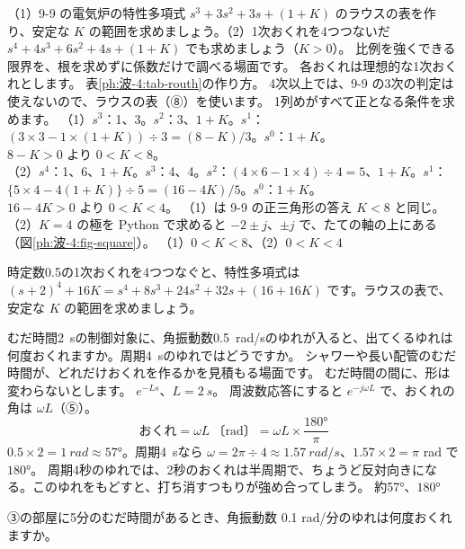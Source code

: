 \label{ph:波-4:ex8}
\begin{phreidai}
（1）9-9 の電気炉の特性多項式 $s^3+3s^2+3s+(1+K)$ のラウスの表を作り、安定な $K$ の範囲を求めましょう。（2）1次おくれを4つつないだ $s^4+4s^3+6s^2+4s+(1+K)$ でも求めましょう（$K>0$）。
\phbamen
比例を強くできる限界を、根を求めずに係数だけで調べる場面です。
\phmushi
各おくれは理想的な1次おくれとします。
\phzu
表\ref{ph:波-4:tab-routh}の作り方。
\phriyu
4次以上では、9-9 の3次の判定は使えないので、ラウスの表（⑧）を使います。
\phtateru
1列めがすべて正となる条件を求めます。
\phtoku
（1）$s^3$：1、3。$s^2$：3、$1+K$。$s^1$：$(3\times3-1\times(1+K))\div3=(8-K)/3$。$s^0$：$1+K$。\\
$8-K>0$ より $0<K<8$。\\
（2）$s^4$：1、6、$1+K$。$s^3$：4、4。$s^2$：$(4\times6-1\times4)\div4=5$、$1+K$。$s^1$：$\{5\times4-4(1+K)\}\div5=(16-4K)/5$。$s^0$：$1+K$。\\
$16-4K>0$ より $0<K<4$。
\phtashikame
（1）は 9-9 の正三角形の答え $K<8$ と同じ。\\
（2）$K=4$ の極を Python で求めると $-2\pm j$、$\pm j$ で、たての軸の上にある（図\ref{ph:波-4:fig-square}）。
\kotae （1）$0<K<8$、（2）$0<K<4$
\end{phreidai}
\begin{jibun}
時定数0.5の1次おくれを4つつなぐと、特性多項式は $(s+2)^4+16K=s^4+8s^3+24s^2+32s+(16+16K)$ です。ラウスの表で、安定な $K$ の範囲を求めましょう。
\end{jibun}

\label{ph:波-4:ex9}
\begin{phreidai}[むだ時間のおくれ]
むだ時間\qty{2}{s}の制御対象に、角振動数\qty{0.5}{rad/s}のゆれが入ると、出てくるゆれは何度おくれますか。周期\qty{4}{s}のゆれではどうですか。
\phbamen
シャワーや長い配管のむだ時間が、どれだけおくれを作るかを見積もる場面です。
\phmushi
むだ時間の間に、形は変わらないとします。
\phzu
$e^{-Ls}$、$L=\qty{2}{s}$。
\phriyu
周波数応答にすると $e^{-j\omega L}$ で、おくれの角は $\omega L$（⑤）。
\phtateru
\[\text{おくれ}=\omega L\ \text{〔rad〕}=\omega L\times\frac{180°}{\pi}\]
\phtoku
$0.5\times2=\qty{1}{rad}\approx57°$。周期\qty{4}{s}なら $\omega=2\pi\div4\approx\qty{1.57}{rad/s}$、$1.57\times2=\pi$ rad で $180°$。
\phtashikame
周期4秒のゆれでは、2秒のおくれは半周期で、ちょうど反対向きになる。このゆれをもどすと、打ち消すつもりが強め合ってしまう。
\kotae 約57°、$180°$
\end{phreidai}
\begin{jibun}
③の部屋に5分のむだ時間があるとき、角振動数 0.1 rad/分のゆれは何度おくれますか。
\end{jibun}

